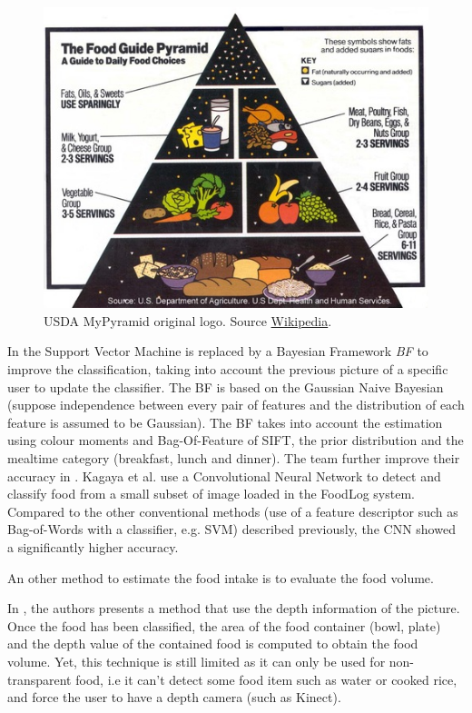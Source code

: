 \begin{figure}
    \centering
    \includegraphics[scale=0.7]{img/my_pyramid.jpg}
    \caption[USDA MyPyramid original logo]{USDA MyPyramid original logo. Source \href{https://en.wikipedia.org/wiki/Food_pyramid_(nutrition)}{Wikipedia}.}
    \label{fig:my_pyramid}
\end{figure}

In \cite{Aizawa2013} the Support Vector Machine is replaced by a Bayesian Framework \textit{BF} to improve the classification, taking into account the previous picture of a specific user to update the classifier. The BF is based on the Gaussian Naive Bayesian (suppose independence between every pair of features and the distribution of each feature is assumed to be Gaussian). The BF takes into account the estimation using colour moments and Bag-Of-Feature of SIFT, the prior distribution and the mealtime category (breakfast, lunch and dinner). 
The team further improve their accuracy in \cite{Kagaya2014}. Kagaya et al. use a Convolutional Neural Network  to detect and classify food from a small subset of image loaded in the FoodLog system. Compared to the other conventional methods (use of a feature descriptor such as Bag-of-Words with a classifier, e.g. SVM) described previously, the CNN showed a significantly higher accuracy.


An other method to estimate the food intake is to evaluate the food volume.

In \cite{Chen2012}, the authors presents a method that use the depth information of the picture. Once the food has been classified, the area of the food container (bowl, plate) and the depth value of the contained food is computed to obtain the food volume.
Yet, this technique is still limited as it can only be used for non-transparent food, i.e it can't detect some food item such as water or cooked rice, and force the user to have a depth camera (such as Kinect).

